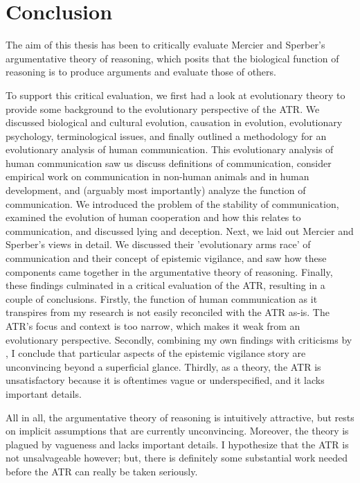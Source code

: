 \chapter*{Conclusion}
\label{ch:conclusion}

The aim of this thesis has been to critically evaluate Mercier and Sperber's argumentative theory of reasoning, which posits that the biological function of reasoning is to produce arguments and evaluate those of others.

To support this critical evaluation, we first had a look at evolutionary theory to provide some background to the evolutionary perspective of the ATR.
We discussed biological and cultural evolution, causation in evolution, evolutionary psychology, terminological issues, and finally outlined a methodology for an evolutionary analysis of human communication.
This evolutionary analysis of human communication saw us discuss definitions of communication, consider empirical work on communication in non-human animals and in human development, and (arguably most importantly) analyze the function of communication. We introduced the problem of the stability of communication, examined the evolution of human cooperation and how this relates to communication, and discussed lying and deception.
Next, we laid out Mercier and Sperber's views in detail. We discussed their 'evolutionary arms race' of communication and their concept of epistemic vigilance, and saw how these components came together in the argumentative theory of reasoning.
Finally, these findings culminated in a critical evaluation of the ATR, resulting in a couple of conclusions. Firstly, the function of human communication as it transpires from my research is not easily reconciled with the ATR as-is. The ATR's focus and context is too narrow, which makes it weak from an evolutionary perspective.
Secondly, combining my own findings with criticisms by \citet{Michaelian13}, I conclude that particular aspects of the epistemic vigilance story are unconvincing beyond a superficial glance.
Thirdly, as a theory, the ATR is unsatisfactory because it is oftentimes vague or underspecified, and it lacks important details.

All in all, the argumentative theory of reasoning is intuitively attractive, but rests on implicit assumptions that are currently unconvincing. Moreover, the theory is plagued by vagueness and lacks important details. I hypothesize that the ATR is not unsalvageable however; but, there is definitely some substantial work needed before the ATR can really be taken seriously.

